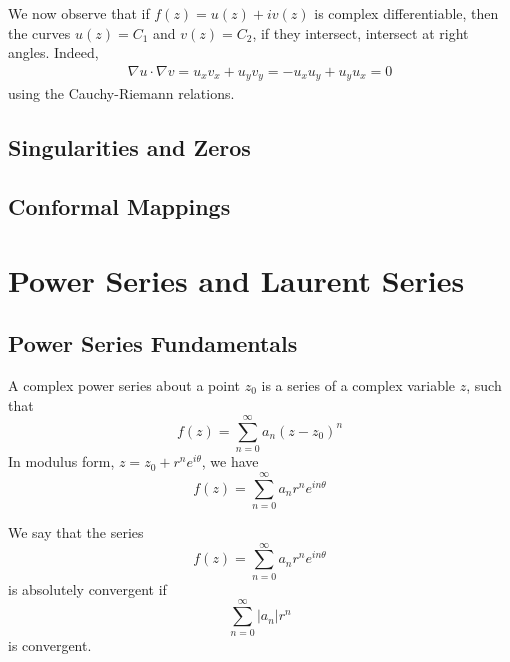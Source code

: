 \documentclass[12pt, a4paper, oneside, openright, titlepage]{book}
\begin{document}
We now observe that if $f(z) = u(z)+iv(z)$ is complex differentiable, then the curves $u(z) = C_1$ and $v(z) = C_2$, if they intersect, intersect at right angles. Indeed, \begin{align*}
    \nabla u\cdot \nabla v = u_xv_x+u_yv_y = -u_xu_y+u_yu_x = 0
\end{align*}
using the Cauchy-Riemann relations.




\section{Singularities and Zeros}


\section{Conformal Mappings}


\chapter{Power Series and Laurent Series}


\section{Power Series Fundamentals}


\begin{defn}
    A complex power series about a point $z_0$ is a series of a complex variable $z$, such that \begin{equation*}
        f(z) = \sum_{n=0}^{\infty}a_n(z-z_0)^n
    \end{equation*}
    In modulus form, $z = z_0+r^ne^{i\theta}$, we have \begin{equation*}
        f(z) = \sum_{n=0}^{\infty}a_nr^ne^{in\theta}
    \end{equation*}
\end{defn}

\begin{defn}
    We say that the series \begin{equation*}
        f(z) = \sum_{n=0}^{\infty}a_nr^ne^{in\theta}
    \end{equation*}
    is absolutely convergent if \begin{equation*}
        \sum_{n=0}^{\infty}|a_n|r^n
    \end{equation*}
    is convergent.
\end{defn}
\end{document}
